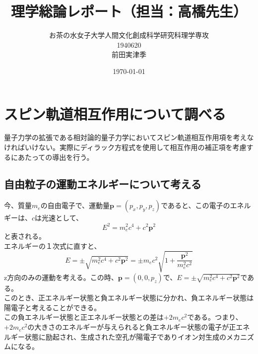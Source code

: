 \documentclass[10pt]{jreport}
\begin{document}
\title{理学総論レポート（担当：高橋先生）}

\author{お茶の水女子大学人間文化創成科学研究科理学専攻 \\1940620 \\ 前田実津季}
\date{\today}
\maketitle

\section*{スピン軌道相互作用について調べる}
量子力学の拡張である相対論的量子力学においてスピン軌道相互作用項を考えなければいけない。実際にディラック方程式を使用して相互作用の補正項を考慮するにあたっての導出を行う。\\
\subsection*{自由粒子の運動エネルギーについて考える}
今、質量$m_e$の自由電子で、運動量$\textbf{p}=(p_x,p_y,p_z)$であると、この電子のエネルギーは、$c$は光速として、
\begin{equation}
E^2=m_e^2c^4+c^2\textbf{p}^2
\end{equation}
と表される。\\
エネルギーの１次式に直すと、\\
\begin{equation}
E=\pm\sqrt{m_e^2c^4+c^2\textbf{p}^2}=\pm m_ec^2\sqrt{1+\frac{\textbf{p}^2}{m_e^2c^2}}
\end{equation}
z方向のみの運動を考える。この時、$\textbf{p}=(0,0,p_z)$で、$E=\pm\sqrt{m_e^2c^4+c^2\textbf{p}^2}$である。\\
このとき、正エネルギー状態と負エネルギー状態に分かれ、負エネルギー状態は陽電子と考えることができる。\\
この負エネルギー状態と正エネルギー状態との差は$+2m_e c^2$である。つまり、$+2m_e c^2$の大きさのエネルギーが与えられると負エネルギー状態の電子が正エネルギー状態に励起され、生成された空孔が陽電子でありイオン対生成のメカニズムになる。
\end{document}
